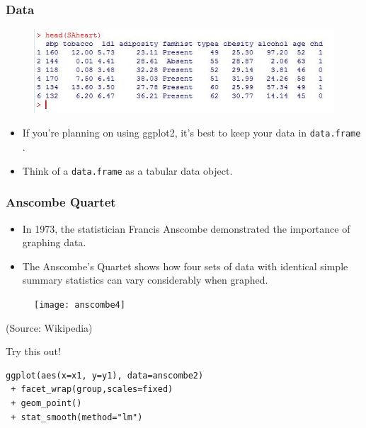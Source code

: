 \documentclass{beamer}
\begin{document}
\begin{frame}[fragile]
	\frametitle{Data}
	\Large
	\vspace{-1.4cm}\begin{figure}
\centering
\includegraphics[width=0.9\linewidth]{SAhearts-dataframe}

\end{figure}

	\begin{itemize}

		\item If you're planning on using ggplot2, it's best to keep your data in \texttt{data.frame} . 
		\item Think of a \texttt{data.frame} as a tabular data object. 
	\end{itemize}
\end{frame}

\begin{frame}[fragile]
	\frametitle{Anscombe Quartet}
	\Large
\begin{itemize}
	\item  In 1973, the statistician Francis Anscombe demonstrated the importance of graphing data.
	\item  The Anscombe's Quartet shows how four sets of data with identical simple summary statistics can vary considerably when graphed.
\end{itemize}

\end{frame}
\begin{frame}[fragile]

	\begin{figure}
		\centering
		\texttt{[image: anscombe4]}
	\end{figure}
(Source: Wikipedia)
\end{frame}
\begin{frame}[fragile]
\Large
Try this out!
\begin{framed}	\begin{verbatim}
ggplot(aes(x=x1, y=y1), data=anscombe2)
 + facet_wrap(group,scales=fixed) 
 + geom_point()
 + stat_smooth(method="lm")

	\end{verbatim}\end{framed}
\end{frame}
\end{document}
